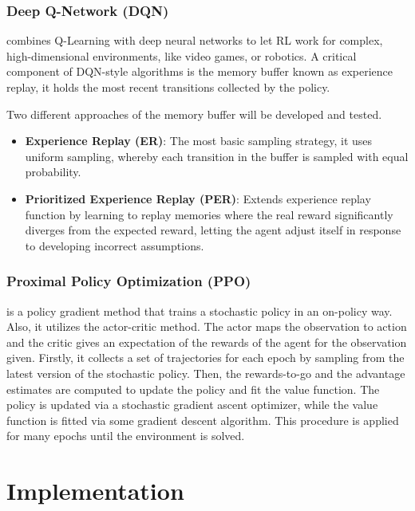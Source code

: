 \documentclass[letterpaper]{article}
\begin{document}
\subsubsection{Deep Q-Network (DQN)} combines Q-Learning with deep neural networks to let RL work for complex, high-dimensional environments, like video games, or robotics. A critical component of DQN-style algorithms is the memory buffer known as experience replay, it holds the most recent transitions collected by the policy.\cite{fedus2020revisiting}

Two different approaches of the memory buffer will be developed and tested.

\begin{itemize}
    \item \textbf{Experience Replay (ER)}: The most basic sampling strategy, it uses uniform sampling, whereby each transition in the buffer is sampled with equal probability.\cite{fedus2020revisiting}
    \item \textbf{Prioritized Experience Replay (PER)}: Extends experience replay function by learning to replay memories where the real reward significantly diverges from the expected reward, letting the agent adjust itself in response to developing incorrect assumptions.\cite{schaul2015prioritized}
\end{itemize}

\subsubsection{Proximal Policy Optimization (PPO)} is a policy gradient method that trains a stochastic policy in an on-policy way. Also, it utilizes the actor-critic method. The actor maps the observation to action and the critic gives an expectation of the rewards of the agent for the observation given. Firstly, it collects a set of trajectories for each epoch by sampling from the latest version of the stochastic policy. Then, the rewards-to-go and the advantage estimates are computed to update the policy and fit the value function. The policy is updated via a stochastic gradient ascent optimizer, while the value function is fitted via some gradient descent algorithm. This procedure is applied for many epochs until the environment is solved. \cite{schulman2017proximal}

\section{Implementation}
\end{document}
